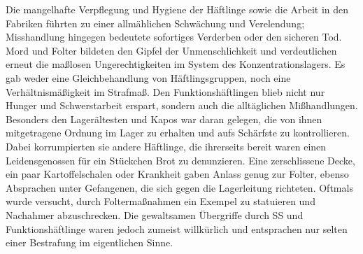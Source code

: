 Die mangelhafte Verpflegung und Hygiene der Häftlinge sowie die Arbeit in den Fabriken führten zu einer allmählichen Schwächung und Verelendung; Misshandlung hingegen bedeutete sofortiges Verderben oder den sicheren Tod. \newline
Mord und Folter bildeten den Gipfel der Unmenschlichkeit und verdeutlichen erneut die maßlosen Ungerechtigkeiten im System des Konzentrationslagers. Es gab weder eine Gleichbehandlung von Häftlingsgruppen, noch eine Verhältnismäßigkeit im Strafmaß. Den Funktionshäftlingen blieb nicht nur Hunger und Schwerstarbeit erspart, sondern auch die alltäglichen Mißhandlungen. Besonders den Lagerältesten und Kapos war daran gelegen, die von ihnen mitgetragene Ordnung im Lager zu erhalten und aufs Schärfste zu kontrollieren. Dabei korrumpierten sie andere Häftlinge, die ihrerseits bereit waren einen Leidensgenossen für ein Stückchen Brot zu denunzieren. Eine zerschlissene Decke, ein paar Kartoffelschalen oder Krankheit gaben Anlass genug zur Folter, ebenso Absprachen unter Gefangenen, die sich gegen die Lagerleitung richteten. Oftmals wurde versucht, durch Foltermaßnahmen ein Exempel zu statuieren und Nachahmer abzuschrecken. Die gewaltsamen Übergriffe durch SS und Funktionshäftlinge waren jedoch zumeist willkürlich und entsprachen nur selten einer Bestrafung im eigentlichen Sinne.
 \newline
